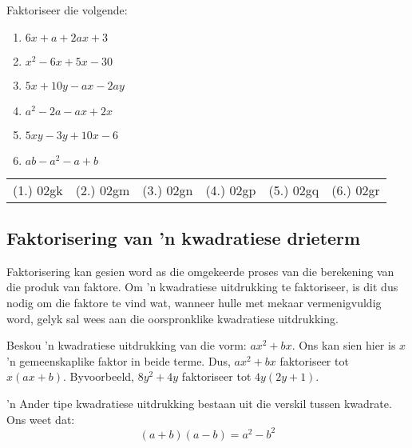 \begin{exercises}{}{
\nopagebreak
Faktoriseer die volgende:
\begin{multicols}{2}
\begin{enumerate}[itemsep=5pt, label=\textbf{\arabic*}. ] 
\item $6x+a+2ax+3$
\item ${x}^{2}-6x+5x-30$
\item $5x+10y-ax-2ay$
\item ${a}^{2}-2a-ax+2x$
\item $5xy-3y+10x-6$
\item $ab - a^{2} - a + b$
\end{enumerate}
\end{multicols}

\par \practiceinfo
\par \begin{tabular}[h]{cccccc}
(1.)	02gk	&
(2.)	02gm	&
(3.)	02gn	&
(4.)	02gp	&
(5.)	02gq	&
(6.)	02gr	\\ %
\end{tabular}
}
\end{exercises}

\subsection* {Faktorisering van 'n kwadratiese drieterm}

    
Faktorisering kan gesien word as die omgekeerde proses van die berekening van die produk van faktore. Om ’n kwadratiese uitdrukking te faktoriseer, is dit dus nodig om die faktore te vind wat, wanneer hulle met mekaar vermenigvuldig word, gelyk sal wees aan die oorspronklike kwadratiese uitdrukking.\par 

Beskou ’n kwadratiese uitdrukking van die vorm: $a{x}^{2}+bx$. Ons kan sien hier is  $x$ ’n gemeenskaplike faktor in beide terme. Dus, $a{x}^{2}+bx$  faktoriseer tot $x(ax+b)$. Byvoorbeeld, $8{y}^{2}+4y$ faktoriseer tot  $4y(2y+1)$.\par 
’n Ander tipe kwadratiese uitdrukking bestaan uit die verskil tussen kwadrate. Ons weet dat:
\begin{equation*}
(a+b)(a-b)={a}^{2}-{b}^{2}
\end{equation*}

